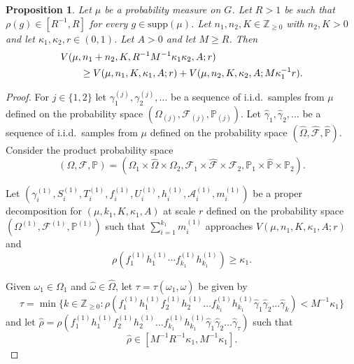 \documentclass[10pt, english,oneside,reqno]{amsart}
\theoremstyle{plain}
\newtheorem{proposition}[theorem]{Proposition}
\theoremstyle{remark}
\numberwithin{equation}{section}
\numberwithin{figure}{section}
\begin{document}
\begin{proposition} \label{VarSumAdds}
    Let $\mu$ be a probability measure on $G$. Let $R > 1$ be such that $\rho(g) \in [R^{-1}, R]$ for every $g \in \mathrm{supp}(\mu)$. Let $n_1, n_2, K \in \mathbb{Z}_{\geq 0}$ with $n_2, K > 0$ and let $\kappa_1, \kappa_2, r \in (0, 1)$. Let $A > 0$ and let $M \geq R$. Then
    \begin{align*}
        \MoveEqLeft V(\mu,  n_1 + n_2, K, R^{-1} M^{-1} \kappa_1 \kappa_2, A; r) \\&\geq V(\mu, n_1, K, \kappa_1, A; r) + V(\mu,  n_2, K, \kappa_2, A; M \kappa_1^{-1} r).
    \end{align*} 
\end{proposition}

\begin{proof}
    For $j \in \{ 1,2 \}$ let $\gamma_1^{(j)}, \gamma_2^{(j)}, \dots$ be a sequence of i.i.d.\ samples from $\mu$ defined on the probability space $\left(\Omega_{(j)}, \mathscr{F}_{(j)}, \mathbb{P}_{(j)}\right)$. Let $\hat{\gamma}_1, \hat{\gamma}_2, \dots$ be a sequence of i.i.d.\ samples from $\mu$ defined on the probability space $\left(\hat{\Omega}, \hat{\mathscr{F}}, \hat{\mathbb{P}}\right)$. Consider the product probability space $$\left(\Omega, \mathscr{F}, \mathbb{P}\right) = \left( \Omega_1 \times \hat{\Omega} \times \Omega_2, \mathscr{F}_1 \times \hat{\mathscr{F}} \times \mathscr{F}_2, \mathbb{P}_1 \times \hat{\mathbb{P}} \times \mathbb{P}_2 \right).$$ 

    Let $\left(\gamma_i^{(1)}, S_i^{(1)}, T_i^{(1)}, f_i^{(1)}, U_i^{(1)}, h_i^{(1)}, \mathscr{A}_i^{(1)}, m_i^{(1)}\right)$ be a proper decomposition for $(\mu, k_1, K, \kappa_1, A)$ at scale $r$ defined on the probability space $\left(\Omega^{(1)}, \mathscr{F}^{(1)}, \mathbb{P}^{(1)}\right)$ such that $\sum_{i = 1}^{k_1} m_i^{(1)}$ approaches $V(\mu,n_1,K,\kappa_1,A;r)$ and  $$ \rho(f_1^{(1)}h_1^{(1)}\cdots f_{k_1}^{(1)}h_{k_1}^{(1)}) \geq \kappa_1.$$ 

    Given $\omega_1 \in \Omega_1$ and $\hat{\omega} \in \hat{\Omega}$, let $\tau = \tau(\omega_1, \hat{\omega})$ be given by $$\tau = \min \{k \in \mathbb{Z}_{\geq 0}: \rho( f^{(1)}_1 h^{(1)}_1 f^{(1)}_2 h^{(1)}_2 \dots f^{(1)}_{k_1} h^{(1)}_{k_1} \hat{\gamma}_1 \hat{\gamma}_2 \dots \hat{\gamma}_k) < M^{-1} \kappa_1  \} $$ and let $\hat{\rho} = \rho( f^{(1)}_1 h^{(1)}_1 f^{(1)}_2 h^{(1)}_2 \dots f^{(1)}_{k_1} h^{(1)}_{k_1} \hat{\gamma}_1 \hat{\gamma}_2 \dots \hat{\gamma}_\tau)$ such that $$\hat{\rho} \in [M^{-1} R^{-1} \kappa_1 , M^{-1} \kappa_1 ]. $$


\end{proof}
\end{document}
